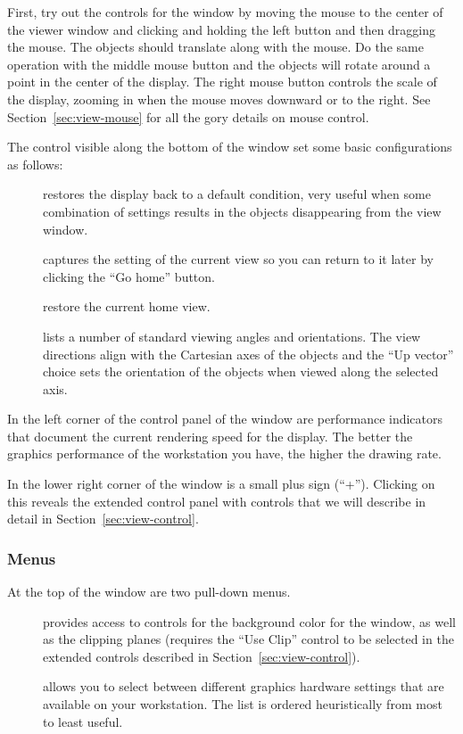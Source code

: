 First, try out the controls for the \graphics{} window by moving the mouse
to the center of the viewer window and clicking and holding the left button
and then dragging the mouse.  The objects should translate along with the
mouse.  Do the same operation with the middle mouse button and the objects
will rotate around a point in the center of the display.  The right mouse
button controls the scale of the display, zooming in  when the mouse moves
downward or to the right.  See Section~\ref{sec:view-mouse} for all the
gory details on mouse control.

The control visible along the bottom of the \viewer{} window set some basic
configurations as follows:
%
\begin{description}
  \item [ ] restores the display back to a default
        condition, very useful when some combination of settings results in
        the objects disappearing from the view window.
  \item [ ] captures the setting of the current view
        so you 
        can return to it later by clicking the ``Go home'' button.
  \item [ ] restore the current home view.
  \item [ ] lists a number of standard viewing angles and
        orientations.  The view directions align with the Cartesian axes
        of the objects and the ``Up vector'' choice sets the orientation of
        the objects when viewed along the selected axis.
\end{description}

In the left corner of the control panel of the \viewer{} window are
performance indicators that document the current rendering speed for the
display.  The better the graphics performance of the workstation you
have, the higher the drawing rate.

In the lower right corner of the \viewer{} window is a small plus sign
(``+'').  Clicking on this reveals the extended control panel with controls
that we will describe in detail in Section~\ref{sec:view-control}.



\subsubsection{Menus}

At the top of the \viewer{} window are two pull-down menus.
\begin{description}
  \item [ ] provides access to controls for the background
        color for the window, as well as the clipping planes (requires the
        ``Use Clip'' control to be selected in the extended controls
        described in Section~\ref{sec:view-control}).
  \item [ ] allows you to select between different graphics
        hardware settings that are available on your workstation.  The list
        is ordered heuristically from most to least useful.
\end{description}

